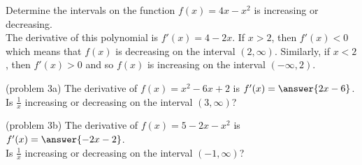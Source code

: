 \documentclass{ximera}
\begin{document}
\begin{example}[example 3]
Determine the intervals on the function $f(x) = 4x - x^2$ is increasing or decreasing.\\
The derivative of this polynomial is $f'(x) = 4 -  2x$. If $x > 2$, then $f'(x) <0$ which means that $f(x)$ is decreasing on the interval $(2, \infty)$.
Similarly, if $x<2$, then $f'(x) >0$ and so $f(x)$ is increasing on the interval $(-\infty, 2)$.
\begin{image}
\end{image}

\end{example}

\begin{problem}(problem 3a)
The derivative of $f(x)=x^2 - 6x + 2$ is $f'(x) = \answer{2x-6}$.\\
Is $\frac{1}{x}$ increasing or decreasing on the interval $(3, \infty)$?
\begin{multipleChoice}
\end{multipleChoice}
\end{problem}


\begin{problem}(problem 3b)
The derivative of $f(x)=5 - 2x - x^2$ is $f'(x) = \answer{-2x-2}$.\\
Is $\frac{1}{x}$ increasing or decreasing on the interval $(-1, \infty)$?
\begin{multipleChoice}
\end{multipleChoice}
\end{problem}
\end{document}
